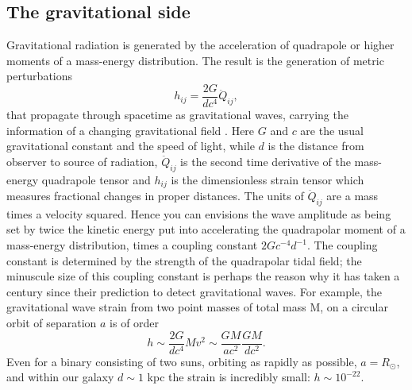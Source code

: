 \subsection{The gravitational side} 

Gravitational radiation is generated by the acceleration of quadrapole or
higher moments of a mass-energy distribution. The result is the generation of
metric perturbations
\begin{equation}  
h_{i j} = \frac{2G}{d c^4}\ddot{Q}_{ij},  
\end{equation}
that propagate through spacetime as gravitational waves, carrying the
information of a changing gravitational field
\citep[\emph{e.g.}]{WaldGR:1984}. Here $G$ and $c$ are the usual gravitational
constant and the speed of light, while $d$ is the distance from observer to
source of radiation, $ \ddot{Q}_{ij}$ is the second time derivative of the
mass-energy quadrapole tensor and $h_{ij}$ is the dimensionless strain tensor
which measures fractional changes in proper distances. The units of
$\ddot{Q}_{ij}$ are a mass times a velocity squared. Hence you can envisions
the wave amplitude as being set by twice the kinetic energy put into
accelerating the quadrapolar moment of a mass-energy distribution, times a
coupling constant $2 Gc^{-4}d^{-1}$. The coupling constant is determined by
the strength of the quadrapolar tidal field; the minuscule size of this
coupling constant is perhaps the reason why it has taken a century since their
prediction to detect gravitational waves. For example, the gravitational wave
strain from two point masses of total mass M, on a circular orbit of
separation $a$ is of order \begin{equation}  h \sim \frac{2G}{d c^4} M v^2
\sim \frac{G M }{a c^2} \frac{G M }{d c^2}.  \label{Eq:BinStrain}
\end{equation} Even for a binary consisting of two suns, orbiting as rapidly
as possible, $a=R_{\odot}$, and within our galaxy $d \sim 1$ kpc the strain is
incredibly small: $h\sim10^{-22}$.



